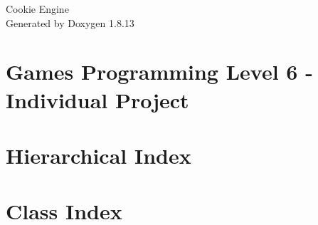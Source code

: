 \documentclass[twoside]{book}
\newcommand{\+}{\discretionary{\mbox{\scriptsize$\hookleftarrow$}}{}{}}
\newcommand{\clearemptydoublepage}{%
  \newpage{\pagestyle{empty}\cleardoublepage}%
}
\begin{document}
\hypersetup{pageanchor=false,
             bookmarksnumbered=true,
             pdfencoding=unicode
            }
\begin{titlepage}
\vspace*{7cm}
\begin{center}%
{\Large Cookie Engine }\\
\vspace*{1cm}
{\large Generated by Doxygen 1.8.13}\\
\end{center}
\end{titlepage}
\clearemptydoublepage
{}
\tableofcontents
\clearemptydoublepage
{}
\hypersetup{pageanchor=true}

\chapter{Games Programming Level 6 -\/ Individual Project}
\label{index}\hypertarget{index}{}
\chapter{Hierarchical Index}

\chapter{Class Index}

\end{document}
